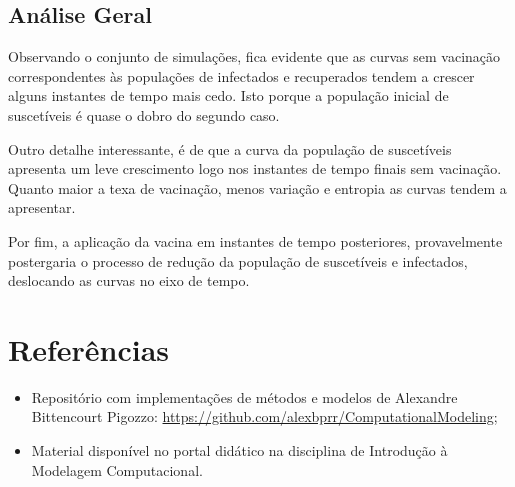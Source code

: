 \documentclass[a4paper, 12pt]{article}
\begin{document}
\subsection*{Análise Geral}

Observando o conjunto de simulações, fica evidente que as curvas sem vacinação correspondentes às populações de infectados e recuperados tendem a crescer alguns instantes de tempo mais cedo. Isto porque a população inicial de suscetíveis é quase o dobro do segundo caso.

Outro detalhe interessante, é de que a curva da população de suscetíveis apresenta um leve crescimento logo nos instantes de tempo finais sem vacinação. Quanto maior a texa de vacinação, menos variação e entropia as curvas tendem a apresentar.

Por fim, a aplicação da vacina em instantes de tempo posteriores, provavelmente postergaria o processo de redução da população de suscetíveis e infectados, deslocando as curvas no eixo de tempo.

\pagebreak

\section*{Referências}

\begin{itemize}
    \item Repositório com implementações de métodos e modelos de Alexandre Bittencourt Pigozzo: \url{https://github.com/alexbprr/ComputationalModeling};
    \item Material disponível no portal didático na disciplina de Introdução à Modelagem Computacional.
\end{itemize}
\end{document}
